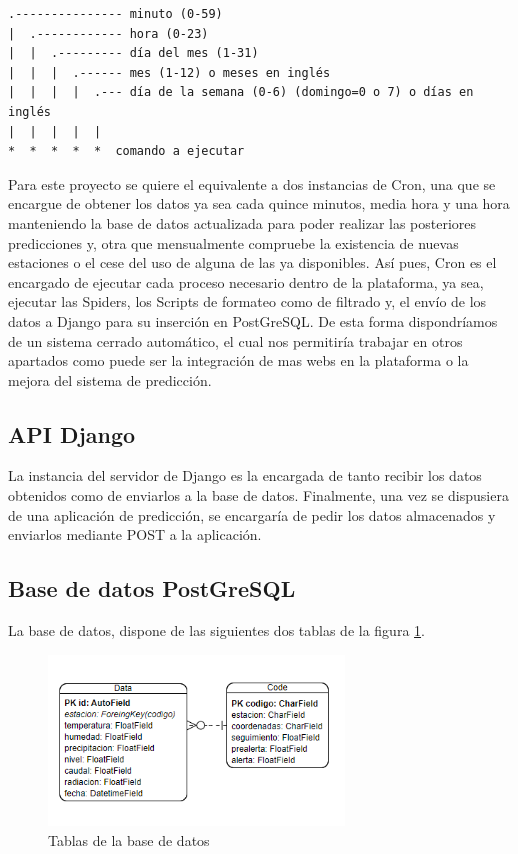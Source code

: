 \begin{verbatim}
.--------------- minuto (0-59) 
|  .------------ hora (0-23)
|  |  .--------- día del mes (1-31)
|  |  |  .------ mes (1-12) o meses en inglés
|  |  |  |  .--- día de la semana (0-6) (domingo=0 o 7) o días en inglés 
|  |  |  |  |
*  *  *  *  *  comando a ejecutar
\end{verbatim}

Para este proyecto se quiere el equivalente a dos instancias de Cron, una que se encargue de obtener los datos ya sea cada quince minutos, media hora y una hora manteniendo la base de datos actualizada para poder realizar las posteriores predicciones y, otra que mensualmente compruebe la existencia de nuevas estaciones o el cese del uso de alguna de las ya disponibles.\newline
\newline
Así pues, Cron es el encargado de ejecutar cada proceso necesario dentro de la plataforma, ya sea, ejecutar las Spiders, los Scripts de formateo como de filtrado y, el envío de los datos a Django para su inserción en PostGreSQL. De esta forma dispondríamos de un sistema cerrado automático, el cual nos permitiría trabajar en otros apartados como puede ser la integración de mas webs en la plataforma o la mejora del sistema de predicción.

\subsection{API Django}
La instancia del servidor de Django es la encargada de tanto recibir los datos obtenidos como de enviarlos a la base de datos. Finalmente, una vez se dispusiera de una aplicación de predicción, se encargaría de pedir los datos almacenados y enviarlos mediante POST a la aplicación.

\subsection{Base de datos PostGreSQL}
La base de datos, dispone de las siguientes dos tablas de la figura \ref{fig:ej33}.

\begin{figure} [H]
	\centering
	\includegraphics[width=0.7\textwidth]{fig/TablasBBDD.png}
	\caption[Tablas de la base de datos]{Tablas de la base de datos}
	\label{fig:ej33}
\end{figure}

